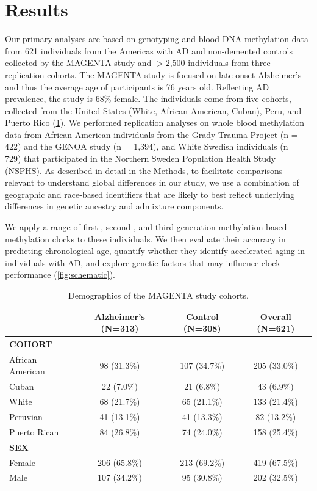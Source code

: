

\section{Results}
Our primary analyses are based on genotyping and blood DNA methylation data from 621 individuals from the Americas with AD and non-demented controls collected by the MAGENTA study and $>$2,500 individuals from three replication cohorts. The MAGENTA study is focused on late-onset Alzheimer's and thus the average age of participants is 76 years old. Reflecting AD prevalence, the study is 68\% female. The individuals come from five cohorts, collected from the United States (White, African American, Cuban), Peru, and Puerto Rico (\cref{tab:cohorts}). We performed replication analyses on whole blood methylation data from African American individuals from the Grady Trauma Project (n = 422) and the GENOA study (n = 1,394), and White Swedish individuals (n = 729) that participated in the Northern Sweden Population Health Study (NSPHS). As described in detail in the Methods, to facilitate comparisons relevant to understand global differences in our study, we use a combination of geographic and race-based identifiers that are likely to best reflect underlying differences in genetic ancestry and admixture components. 

We apply a range of first-, second-, and third-generation methylation-based methylation clocks to these individuals. We then evaluate their accuracy in predicting chronological age, quantify whether they identify accelerated aging in individuals with AD, and explore genetic factors that may influence clock performance (\cref{fig:schematic}).

\schematic

\begin{table}[htbp]
    \centering
    \begin{tabular}{lccc}
        \toprule
        & \textbf{Alzheimer's (N=313)} & \textbf{Control (N=308)} & \textbf{Overall (N=621)} \\
        \midrule
        \textbf{COHORT} & & & \\
        African American & 98 (31.3\%) & 107 (34.7\%) & 205 (33.0\%) \\
        Cuban & 22 (7.0\%) & 21 (6.8\%) & 43 (6.9\%) \\
        White & 68 (21.7\%) & 65 (21.1\%) & 133 (21.4\%) \\
        Peruvian & 41 (13.1\%) & 41 (13.3\%) & 82 (13.2\%) \\
        Puerto Rican & 84 (26.8\%) & 74 (24.0\%) & 158 (25.4\%) \\
        \midrule
        \textbf{SEX} & & & \\
        Female & 206 (65.8\%) & 213 (69.2\%) & 419 (67.5\%) \\
        Male & 107 (34.2\%) & 95 (30.8\%) & 202 (32.5\%) \\
        \bottomrule
    \end{tabular}
    \caption{Demographics of the MAGENTA study cohorts.}
    \label{tab:cohorts}
\end{table}

